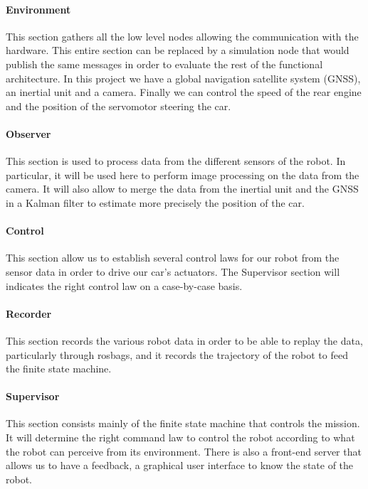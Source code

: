 \paragraph{Environment} This section gathers all the low level nodes allowing the 
communication with the hardware. This entire section can be replaced by a simulation
node that would publish the same messages in order to evaluate the rest of the 
functional architecture. In this project we have a global navigation satellite system
(GNSS), an inertial unit and a camera. Finally we can control the speed of the rear
engine and the position of the servomotor steering the car.

\paragraph{Observer} This section is used to process data from the different sensors of
the robot. In particular, it will be used here to perform image processing on the data
from the camera. It will also allow to merge the data from the inertial unit and the GNSS
in a Kalman filter to estimate more precisely the position of the car.

\paragraph{Control} This section allow us to establish several control laws for our robot
from the sensor data in order to drive our car's actuators. The Supervisor section will
indicates the right control law on a case-by-case basis.

\paragraph{Recorder} This section records the various robot data in order to be able to 
replay the data, particularly through rosbags, and it records the trajectory of the robot
to feed the finite state machine.

\paragraph{Supervisor} This section consists mainly of the finite state machine that controls
the mission. It will determine the right command law to control the robot according to what the
robot can perceive from its environment. There is also a front-end server that allows us to have
a feedback, a graphical user interface to know the state of the robot.


